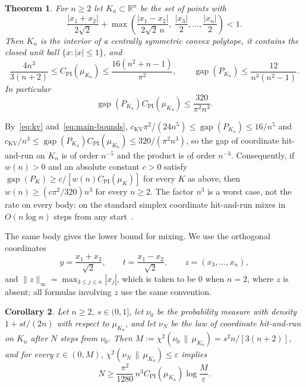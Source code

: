 \documentclass[11pt]{amsart}
\newtheorem{theorem}{Theorem}[section]
\newtheorem{corollary}[theorem]{Corollary}
\theoremstyle{remark}
\numberwithin{equation}{section}
\newcommand{\R}{\mathbb R}
\newcommand{\gap}{\operatorname{gap}}
\newcommand{\CPI}{C_{\mathrm{PI}}}
\begin{document}
\begin{theorem}\label{thm:main}
For $n\ge2$ let $K_n\subset\R^n$ be the set of points with
\[
 \frac{|x_1+x_2|}{2\sqrt2}
 +\max\left(\frac{|x_1-x_2|}{2\sqrt2\,n},\
 \frac{|x_3|}{2},\ldots,\frac{|x_n|}{2}\right)<1 .
\]
Then $K_n$ is the interior of a centrally symmetric convex polytope, it
contains the closed unit ball $\{x:|x|\le1\}$, and
\begin{equation}\label{eq:main-bounds}
 \frac{4n^3}{3(n+2)}\le\CPI(\mu_{K_n})
 \le\frac{16(n^2+n-1)}{\pi^2},\qquad
 \gap(P_{K_n})\le\frac{12}{n^3(n^2-1)} .
\end{equation}
In particular
\begin{equation}\label{eq:product}
 \gap(P_{K_n})\CPI(\mu_{K_n})\le \frac{320}{\pi^2n^3}.
\end{equation}
\end{theorem}

By~\eqref{eq:kv} and~\eqref{eq:main-bounds},
$c_{\mathrm{KV}}\pi^2/(24n^5)\le\gap(P_{K_n})\le16/n^5$ and
$c_{\mathrm{KV}}/n^3\le\gap(P_{K_n})\CPI(\mu_{K_n})\le320/(\pi^2n^3)$, so
the gap of coordinate hit-and-run on $K_n$ is of order $n^{-5}$ and the
product is of order $n^{-3}$. Consequently, if $w(n)>0$ and an absolute
constant $c>0$ satisfy $\gap(P_K)\ge c/[w(n)\CPI(\mu_K)]$ for every $K$ as
above, then $w(n)\ge(c\pi^2/320)n^3$ for every $n\ge2$. The factor $n^3$ is a worst case, not the rate on every body: on the standard simplex
coordinate hit-and-run mixes in $O(n\log n)$ steps from any start~\cite{CLQSSYZ}.

The same body gives the lower bound for mixing. We use the orthogonal
coordinates
\begin{equation}\label{eq:rotation}
 y=\frac{x_1+x_2}{\sqrt2},\qquad
 t=\frac{x_1-x_2}{\sqrt2},\qquad z=(x_3,\ldots,x_n),
\end{equation}
and $\|z\|_\infty=\max_{3\le j\le n}|x_j|$, which is taken to be $0$ when $n=2$, where $z$ is
absent; all formulas involving $z$ use the same convention.

\begin{corollary}\label{cor:mixing}
Let $n\ge2$, $s\in(0,1]$, let $\nu_0$ be the probability measure with
density $1+st/(2n)$ with respect to $\mu_{K_n}$, and let $\nu_N$ be the law
of coordinate hit-and-run on $K_n$ after $N$ steps from $\nu_0$. Then
$M:=\chi^2(\nu_0\,\|\,\mu_{K_n})=s^2n/[3(n+2)]$, and for every
$\varepsilon\in(0,M)$, $\chi^2(\nu_N\,\|\,\mu_{K_n})\le\varepsilon$
implies
\[
 N\ge\frac{\pi^2}{1280}\,n^3\CPI(\mu_{K_n})\log\frac M\varepsilon .
\]
\end{corollary}
\end{document}
